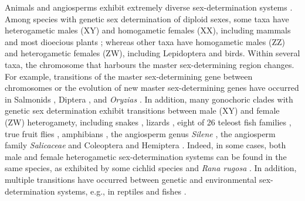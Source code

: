 \documentclass[12pt]{article}
\begin{document}
Animals and angiosperms exhibit extremely diverse sex-determination systems \citep[reviewed in][]{Bull:1983vi,Charlesworth:2010it,Beukeboom:2014vb,Bachtrog:2014bx}. 
Among species with genetic sex determination of diploid sexes, some taxa have heterogametic males (XY) and homogametic females (XX), including %
mammals and most dioecious plants \citep{Ming:2011iy}; whereas other taxa have homogametic males (ZZ) and heterogametic females (ZW), including Lepidoptera and birds. 
Within several taxa, the chromosome that harbours the master sex-determining region changes. 
For example, transitions of the master sex-determining gene between chromosomes or the evolution of new master sex-determining genes have occurred in Salmonids \citep{Li:2011fm,Yano:2012di}, Diptera \citep{Vicoso:2015hf}, and \textit{Oryzias} \citep{Myosho:2012fv}.
In addition, many gonochoric clades with genetic sex determination exhibit transitions between male (XY) and female (ZW) heterogamety, including snakes \citep{Gamble2017}, lizards \citep{Ezaz:2009tk}, eight of 26 teleost fish families \citep{Mank:2006bt}, true fruit flies \citep[Tephritids,][]{Vicoso:2015hf}, amphibians \citep{Hillis:1990gu}, the angiosperm genus \textit{Silene} \citep{Slancarova:2013dq}, the angiosperm family \textit{Salicaceae} \citep{Pucholt2015,Pucholt2017} and Coleoptera and Hemiptera \citep[][plate 2]{Beukeboom:2014vb}.
Indeed, in some cases, both male and female heterogametic sex-determination systems can be found in the same species, as exhibited by some cichlid species \citep{Ser:2010iq} and \textit{Rana rugosa} \citep{Ogata:2007jm, Miura2007}. 
In addition, multiple transitions have occurred between genetic and environmental sex-determination systems, e.g., in reptiles and fishes \citep{Conover:1987in,Mank:2006bt,Pokorna:2009ui,Ezaz:2009tk,Pen:2010kk,Holleley:2015hc}.

\end{document}
